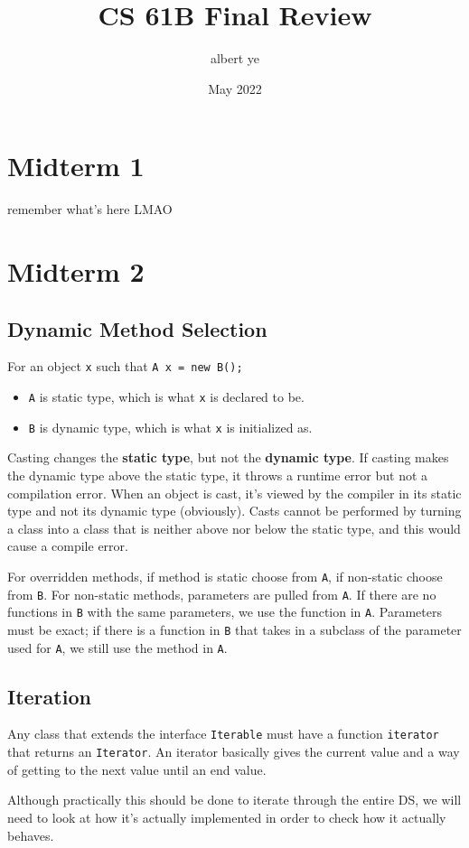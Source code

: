 \documentclass{article}
\title{CS 61B Final Review}
\author{albert ye}
\date{May 2022}
\newcommand{\code}{\texttt}
\begin{document}
\maketitle
\section{Midterm 1}
remember what's here LMAO
\section{Midterm 2}
\subsection{Dynamic Method Selection}
For an object \code{x} such that \code{A x = new B();}
\begin{itemize}
\item \code{A} is static type, which is what \code{x} is declared to be.
\item \code{B} is dynamic type, which is what \code{x} is initialized as.
\end{itemize}

Casting changes the \textbf{static type}, but not the \textbf{dynamic type}. If casting makes the dynamic type above the static type, it throws a runtime error but not a compilation error. When an object is cast, it's viewed by the compiler in its static type and not its dynamic type (obviously). Casts cannot be performed by turning a class into a class that is neither above nor below the static type, and this would cause a compile error.

For overridden methods, if method is static choose from \code{A}, if non-static choose from \code{B}. For non-static methods, parameters are pulled from \code{A}. If there are no functions in \code{B} with the same parameters, we use the function in \code{A}. Parameters must be exact; if there is a function in \code{B} that takes in a subclass of the parameter used for \code{A}, we still use the method in \code{A}.
\subsection{Iteration}
Any class that extends the interface \code{Iterable} must have a function \code{iterator} that returns an \code{Iterator}. An iterator basically gives the current value and a way of getting to the next value until an end value.

Although practically this should be done to iterate through the entire DS, we will need to look at how it's actually implemented in order to check how it actually behaves.
\end{document}

